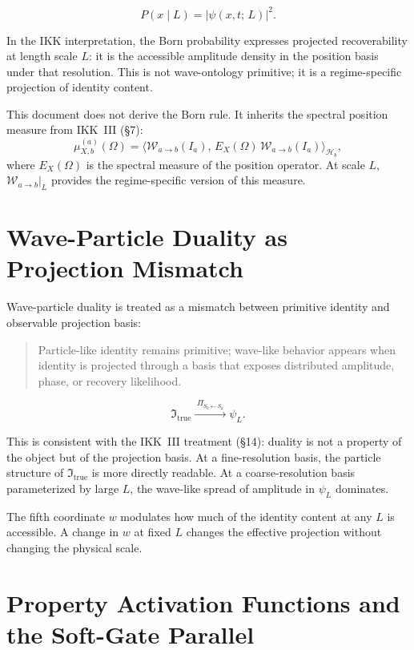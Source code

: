 \documentclass[11pt,a4paper,oneside]{article}
\newcommand{\Ia}{I_a}                               %
\newcommand{\Itrue}{\mathfrak{I}_{\mathrm{true}}}   %
\newcommand{\Hb}{\mathcal{H}_b}               %
\newcommand{\wcoord}{w}
\newcommand{\PiS}[2]{\Pi_{S_{#2}\leftarrow S_{#1}}}  %
\newcommand{\Wab}{\mathcal{W}_{a\to b}}        %
\begin{document}
\[
P(x \mid L) = |\psi(x,t;\, L)|^2.
\]

In the IKK interpretation, the Born probability expresses projected recoverability at length scale $L$: it is the accessible amplitude density in the position basis under that resolution. This is not wave-ontology primitive; it is a regime-specific projection of identity content.

This document does not derive the Born rule. It inherits the spectral position measure from IKK~III (\S{}7):
\[
\mu_{X,b}^{(a)}(\Omega) = \langle \Wab(\Ia),\, E_X(\Omega)\, \Wab(\Ia)\rangle_{\Hb},
\]
where $E_X(\Omega)$ is the spectral measure of the position operator. At scale $L$, $\Wab|_L$ provides the regime-specific version of this measure.

\section{Wave-Particle Duality as Projection Mismatch}

Wave-particle duality is treated as a mismatch between primitive identity and observable projection basis:

\begin{quote}
Particle-like identity remains primitive; wave-like behavior appears when identity is projected through a basis that exposes distributed amplitude, phase, or recovery likelihood.
\end{quote}

\[
\Itrue \xrightarrow{\;\PiS{a}{b}\;} \psi_L.
\]

This is consistent with the IKK~III treatment (\S{}14): duality is not a property of the object but of the projection basis. At a fine-resolution basis, the particle structure of $\Itrue$ is more directly readable. At a coarse-resolution basis parameterized by large $L$, the wave-like spread of amplitude in $\psi_L$ dominates.

The fifth coordinate $\wcoord$ modulates how much of the identity content at any $L$ is accessible. A change in $\wcoord$ at fixed $L$ changes the effective projection without changing the physical scale.

\section{Property Activation Functions and the Soft-Gate Parallel}
\end{document}
